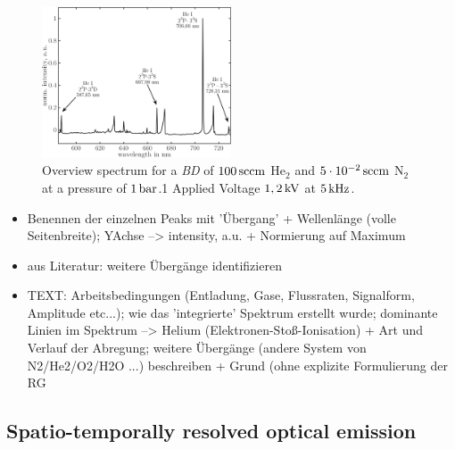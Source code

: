 \documentclass[a4paper,10pt]{article}
\newcommand{\tenpo}[1]{ 10^{#1}}
\newcommand{\tilt}[1]{\textit{#1}}
\begin{document}
				\begin{figure}
					\centering
					\includegraphics[width=0.5\textwidth]{figures/results/int_spectrum}
					\caption{Overview spectrum for a \tilt{BD} of $\unit[100]{sccm}$ He$_2$ and $\unit[5\cdot\tenpo{-2}]{sccm}$ N$_2$ at a pressure of $\unit[1]{bar}$.1 Applied Voltage $\unit[1,2]{kV}$ at $\unit[5]{kHz}$.}
					\label{img:intspec}
				\end{figure}
		
		\begin{itemize}
			\item Benennen der einzelnen Peaks mit 'Übergang' + Wellenlänge (volle Seitenbreite); YAchse --> intensity, a.u. + Normierung auf Maximum
			\item aus Literatur: weitere Übergänge identifizieren
			\item TEXT: Arbeitsbedingungen (Entladung, Gase, Flussraten, Signalform, Amplitude etc...); wie das 'integrierte' Spektrum erstellt wurde; dominante Linien im Spektrum --> Helium (Elektronen-Stoß-Ionisation) + Art und Verlauf der Abregung; weitere Übergänge (andere System von N2/He2/O2/H2O ...) beschreiben + Grund (ohne explizite Formulierung der RG
		\end{itemize}
		
		\subsection{Spatio-temporally resolved optical emission}\label{subsec:stroe}
		
			\onecolumn
				
\end{document}
